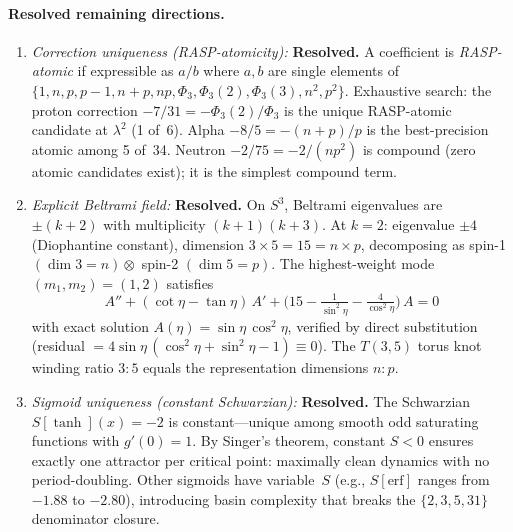 \documentclass[12pt,a4paper]{article}
\theoremstyle{definition}
\newcommand{\Phithree}{\Phi_3}
\begin{document}
\paragraph{Resolved remaining directions.}
\begin{enumerate}
  \item[(a)] \emph{Correction uniqueness (RASP-atomicity):} \textbf{Resolved.}
        A coefficient is \emph{RASP-atomic} if expressible as $a/b$ where
        $a,b$ are single elements of
        $\{1, n, p, p\!-\!1, n\!+\!p, np, \Phithree, \Phithree(2), \Phithree(3), n^2, p^2\}$.
        Exhaustive search: the proton correction $-7/31 = -\Phithree(2)/\Phithree$
        is the unique RASP-atomic candidate at $\lambda^2$ (1 of~6).
        Alpha $-8/5 = -(n+p)/p$ is the best-precision atomic among 5 of~34.
        Neutron $-2/75 = -2/(np^2)$ is compound (zero atomic candidates exist);
        it is the simplest compound term.

  \item[(b)] \emph{Explicit Beltrami field:} \textbf{Resolved.}
        On $S^3$, Beltrami eigenvalues are $\pm(k+2)$ with multiplicity
        $(k+1)(k+3)$. At $k=2$: eigenvalue $\pm 4$ (Diophantine constant),
        dimension $3 \times 5 = 15 = n \times p$, decomposing as
        spin-1 $(\dim 3 = n) \otimes$ spin-2 $(\dim 5 = p)$.
        The highest-weight mode $(m_1, m_2) = (1,2)$ satisfies
        \[
          A'' + (\cot\eta - \tan\eta)\,A' + \bigl(15 - \tfrac{1}{\sin^2\!\eta}
          - \tfrac{4}{\cos^2\!\eta}\bigr)\,A = 0
        \]
        with exact solution $A(\eta) = \sin\eta\,\cos^2\!\eta$, verified by
        direct substitution (residual $= 4\sin\eta\,(\cos^2\!\eta + \sin^2\!\eta - 1)
        \equiv 0$). The $T(3,5)$ torus knot winding ratio $3\!:\!5$ equals the
        representation dimensions $n\!:\!p$.

  \item[(c)] \emph{Sigmoid uniqueness (constant Schwarzian):} \textbf{Resolved.}
        The Schwarzian $S[\tanh](x) = -2$ is constant---unique among smooth odd
        saturating functions with $g'(0) = 1$. By Singer's theorem, constant
        $S < 0$ ensures exactly one attractor per critical point: maximally clean
        dynamics with no period-doubling. Other sigmoids have variable~$S$
        (e.g., $S[\mathrm{erf}]$ ranges from $-1.88$ to $-2.80$), introducing
        basin complexity that breaks the $\{2,3,5,31\}$ denominator closure.
\end{enumerate}
\end{document}
